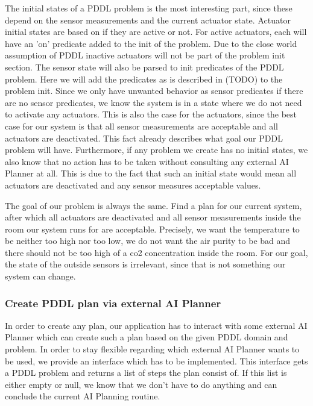 \documentclass[runningheads]{llncs}
\begin{document}
    The initial states of a PDDL problem is the most interesting part, since these depend on the sensor measurements and the current actuator state. Actuator initial states are based on if they are active or not. 
    For active actuators, each will have an 'on' predicate added to the init of the problem. Due to the close world assumption of PDDL inactive actuators will not be part of the problem init section. 
    The sensor state will also be parsed to init predicates of the PDDL problem. Here we will add the predicates as is described in (TODO) to the problem init. Since we only have unwanted behavior as sensor predicates if there are no sensor predicates, we know the system is in a state where we do not need to activate any actuators. This is also the case for the actuators, since the best case for our system is that all sensor measurements are acceptable and all actuators are deactivated. This fact already describes what goal our PDDL problem will have. Furthermore, if any problem we create has no initial states, we also know that no action has to be taken without consulting any external AI Planner at all. This is due to the fact that such an initial state would mean all actuators are deactivated and any sensor measures acceptable values.

    The goal of our problem is always the same. Find a plan for our current system, after which all actuators are deactivated and all sensor measurements inside the room our system runs for are acceptable. Precisely, we want the temperature to be neither too high nor too low, we do not want the air purity to be bad and there should not be too high of a co2 concentration inside the room. For our goal, the state of the outside sensors is irrelevant, since that is not something our system can change.

    \subsubsection{Create PDDL plan via external AI Planner}
    In order to create any plan, our application has to interact with some external AI Planner which can create such a plan based on the given PDDL domain and problem. In order to stay flexible regarding which external AI Planner wants to be used, we provide an interface which has to be implemented. This interface gets a PDDL problem and returns a list of steps the plan consist of. If this list is either empty or null, we know that we don't have to do anything and can conclude the current AI Planning routine. 
\end{document}
